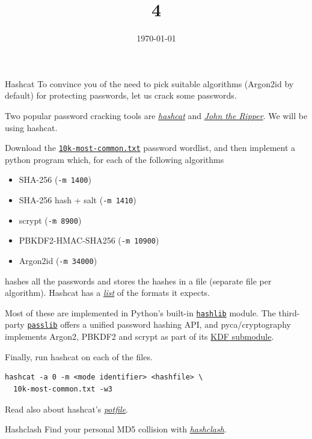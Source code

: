 \documentclass{practice}
\title{4}
\date{\today}
\begin{document}
\maketitle

\begin{task}{Hashcat}
  To convince you of the need to pick suitable algorithms (Argon2id by default) for protecting passwords, let us crack some passwords.

  Two popular password cracking tools are \href{https://hashcat.net/hashcat/}{\textit{hashcat}} and \href{https://www.openwall.com/john/}{\textit{John the Ripper}}.
  We will be using hashcat.

  Download the \href{https://raw.githubusercontent.com/danielmiessler/SecLists/refs/heads/master/Passwords/Common-Credentials/10k-most-common.txt}{\texttt{10k-most-common.txt}} password wordlist, and then implement a python program which, for each of the following algorithms
  \begin{itemize}
    \item SHA-256 (\texttt{-m 1400})
    \item SHA-256 hash + salt (\texttt{-m 1410})
    \item scrypt (\texttt{-m 8900})
    \item PBKDF2-HMAC-SHA256 (\texttt{-m 10900})
    \item Argon2id (\texttt{-m 34000})
  \end{itemize}
  hashes all the passwords and stores the hashes in a file (separate file per algorithm).
  Hashcat has a \href{https://hashcat.net/wiki/doku.php?id=example_hashes}{\textit{list}} of the formats it expects.

  Most of these are implemented in Python's built-in \href{https://docs.python.org/3/library/hashlib.html}{\texttt{hashlib}} module.
  The third-party \href{https://passlib.readthedocs.io/en/stable/}{\texttt{passlib}} offers a unified password hashing API, and pyca/cryptography implements Argon2, PBKDF2 and scrypt as part of its \href{https://cryptography.io/en/latest/hazmat/primitives/key-derivation-functions/#variable-cost-algorithms}{KDF submodule}.

  Finally, run hashcat on each of the files.
  \begin{Verbatim}
hashcat -a 0 -m <mode identifier> <hashfile> \
  10k-most-common.txt -w3
  \end{Verbatim}

  Read also about hashcat's \href{https://hashcat.net/faq/potfile}{\emph{potfile}}.
\end{task}

\begin{task}{Hashclash}
  Find your personal MD5 collision with \href{https://github.com/cr-marcstevens/hashclash}{\textit{hashclash}}.
\end{task}
\end{document}
